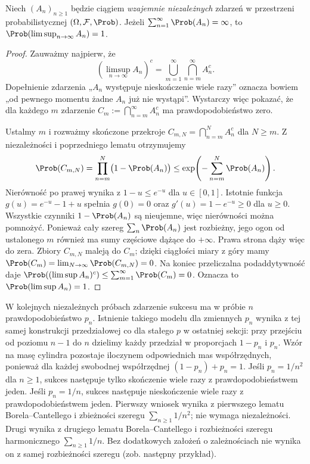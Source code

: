 \begin{twierdzenie}
Niech $(A_n)_{n\geq1}$ będzie ciągiem \emph{wzajemnie niezależnych}
zdarzeń w przestrzeni probabilistycznej $(\Omega,\mathcal F,\Prob)$.
Jeżeli $\sum_{n=1}^\infty\Prob(A_n)=\infty$, to
$\Prob(\limsup_{n\to\infty}A_n)=1$.
\end{twierdzenie}
\begin{proof}
Zauważmy najpierw, że
\[
(\limsup_{n\to\infty}A_n)^c
=\bigcup_{m=1}^\infty\bigcap_{n=m}^\infty A_n^c.
\]
Dopełnienie zdarzenia „$A_n$ występuje nieskończenie wiele
razy” oznacza bowiem „od pewnego momentu żadne $A_n$
już nie wystąpi”. Wystarczy więc pokazać, że dla każdego
$m$ zdarzenie $C_m:=\bigcap_{n=m}^\infty A_n^c$
ma prawdopodobieństwo zero.

Ustalmy $m$ i rozważmy skończone przekroje
$C_{m,N}=\bigcap_{n=m}^N A_n^c$ dla $N\geq m$.
Z niezależności i poprzedniego lematu otrzymujemy
\[
\Prob(C_{m,N})=\prod_{n=m}^N\bigl(1-\Prob(A_n)\bigr)
\leq \exp\!\left(-\sum_{n=m}^N\Prob(A_n)\right).
\]
Nierówność po prawej wynika z $1-u\leq e^{-u}$ dla $u\in[0,1]$.
Istotnie funkcja $g(u)=e^{-u}-1+u$ spełnia $g(0)=0$
oraz $g'(u)=1-e^{-u}\geq0$ dla $u\geq0$. Wszystkie czynniki
$1-\Prob(A_n)$ są nieujemne, więc nierówności można pomnożyć.
Ponieważ cały szereg $\sum_n\Prob(A_n)$ jest rozbieżny,
jego ogon od ustalonego $m$ również ma sumy częściowe
dążące do $+\infty$. Prawa strona dąży więc do zera.
Zbiory $C_{m,N}$ maleją do $C_m$; dzięki ciągłości
miary z góry mamy
$\Prob(C_m)=\lim_{N\to\infty}\Prob(C_{m,N})=0$.
Na koniec przeliczalna podaddytywność daje
$\Prob((\limsup A_n)^c)
\leq\sum_{m=1}^\infty\Prob(C_m)=0$.
Oznacza to $\Prob(\limsup A_n)=1$.
\end{proof}

\begin{przyklad}
W kolejnych niezależnych próbach zdarzenie sukcesu ma w próbie $n$
prawdopodobieństwo $p_n$. Istnienie takiego modelu dla zmiennych
$p_n$ wynika z tej samej konstrukcji przedziałowej co dla stałego
$p$ w ostatniej sekcji: przy przejściu od poziomu $n-1$ do $n$
dzielimy każdy przedział w proporcjach $1-p_n$ i $p_n$.
Wzór na masę cylindra pozostaje iloczynem odpowiednich mas
współrzędnych, ponieważ dla każdej swobodnej współrzędnej
$(1-p_n)+p_n=1$. Jeśli $p_n=1/n^2$ dla $n\geq1$,
sukces następuje tylko skończenie wiele razy z prawdopodobieństwem jeden.
Jeśli $p_n=1/n$, sukces następuje nieskończenie wiele razy
z prawdopodobieństwem jeden. Pierwszy wniosek wynika z pierwszego lematu Borela--Cantellego
i zbieżności szeregu $\sum_{n\geq1}1/n^2$; nie wymaga niezależności.
Drugi wynika z drugiego lematu Borela--Cantellego i rozbieżności
szeregu harmonicznego $\sum_{n\geq1}1/n$.
Bez dodatkowych założeń o zależnościach nie wynika on
z samej rozbieżności szeregu (zob. następny przykład).
\end{przyklad}

